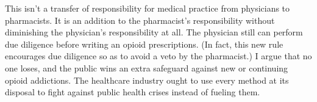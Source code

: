 \documentclass[11.5pt]{article}
\begin{document}
This isn't a transfer of responsibility for medical practice from physicians to pharmacists. It is an addition to the pharmacist's responsibility without diminishing the physician's responsibility at all. The physician still can perform due diligence before writing an opioid prescriptions. (In fact, this new rule encourages due diligence so as to avoid a veto by the pharmacist.) I argue that no one loses, and the public wins an extra safeguard against new or continuing opioid addictions. The healthcare industry ought to use every method at its disposal to fight against public health crises instead of fueling them.
\end{document}
